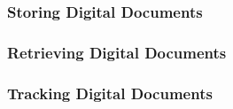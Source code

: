 \subsubsection{Storing Digital Documents}

\subsubsection{Retrieving Digital Documents}

\subsubsection{Tracking Digital Documents}